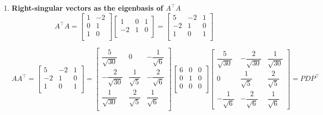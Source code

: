 \begin{enumerate}
    \item \textbf{Right-singular vectors as the eigenbasis of $A^\top A$}
    \[
        A^\top A = 
        \begin{bmatrix}
            1 & -2 \\
            0 & 1 \\
            1 & 0 \\
        \end{bmatrix} 
        \begin{bmatrix}
            1 & 0 & 1 \\
            -2 & 1 & 0 \\
        \end{bmatrix}
        =
        \begin{bmatrix}
            5 & -2 & 1 \\
            -2 & 1 & 0 \\
            1 & 0 & 1 \\
        \end{bmatrix}
    \]


    \[
        \renewcommand{\arraystretch}{2}
        A A^\top = 
        \begin{bmatrix}
            5 & -2 & 1 \\
            -2 & 1 & 0 \\
            1 & 0 & 1 \\
        \end{bmatrix}
        =
        \begin{bmatrix}
            \dfrac{5}{\sqrt{30}} & 0 & -\dfrac{1}{\sqrt{6}} \\
            -\dfrac{2}{\sqrt{30}} & \dfrac{1}{\sqrt{5}} & -\dfrac{2}{\sqrt{6}} \\
            \dfrac{1}{\sqrt{30}} & \dfrac{2}{\sqrt{5}} & \dfrac{1}{\sqrt{6}} \\
        \end{bmatrix}
        \begin{bmatrix}
            6 & 0 & 0\\
            0 & 1 & 0 \\
            0 & 0 & 0 \\
        \end{bmatrix}
        \begin{bmatrix}
            \dfrac{5}{\sqrt{30}} & -\dfrac{2}{\sqrt{30}} & \dfrac{1}{\sqrt{30}} \\
            0 & \dfrac{1}{\sqrt{5}} & \dfrac{2}{\sqrt{5}} \\
            -\dfrac{1}{\sqrt{6}} & -\dfrac{2}{\sqrt{6}} & \dfrac{1}{\sqrt{6}}
        \end{bmatrix}
        = PDP^\top
    \]


\end{enumerate}
